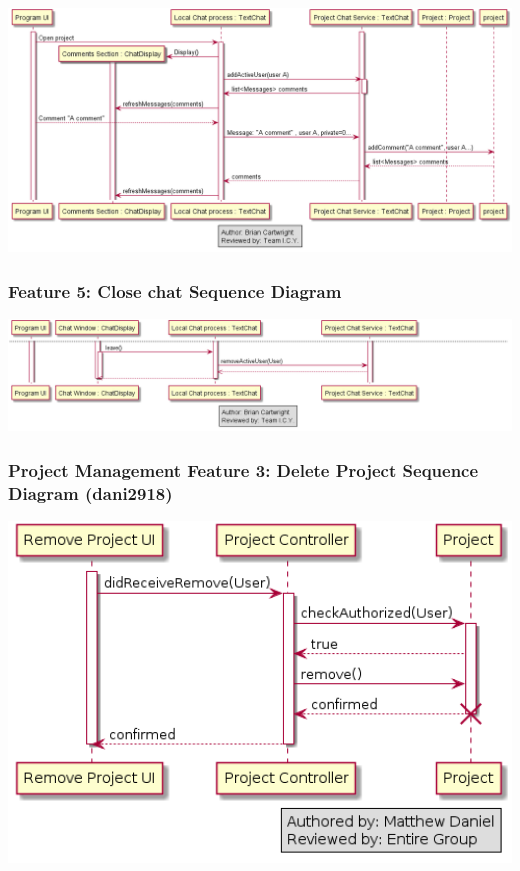 \documentclass[twoside,letterpaper]{article}
\begin{document}
	\bigskip
	
	\includegraphics[width=6.0in]{images/SequenceDiagrams/Comms_LeaveComment}
	
	\newpage
	
	\subsubsection[Communication Feature 5: Close chat Sequence Diagram]{\rmfamily\bfseries\color{black}
		Feature 5: Close chat Sequence Diagram}
	\hypertarget{RefHeading22059017292}{}
	
	\bigskip
	
	\includegraphics[width=6.0in]{images/SequenceDiagrams/Comms_CloseProjectChat}
	
	\newpage
	
	\subsubsection[Project Management Feature 3: Delete Project Sequence Diagram (dani2918)]{\rmfamily\bfseries\color{black}
		Project Management Feature 3: Delete Project Sequence Diagram  (dani2918)}
	
	\bigskip
	\label{pm:sd4}
	\includegraphics[width=6.0in]{images/SequenceDiagrams/PMDeleteProject}
	
\end{document}
